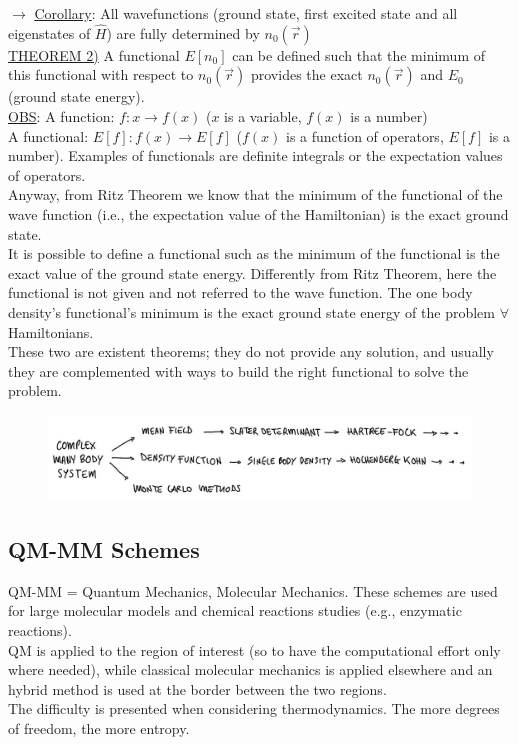 $\rightarrow\,\,$\ul{Corollary}: All wavefunctions (ground state, first excited state and all eigenstates of $\hat{H}$) are fully determined by $n_0(\vec{r})$\\

\ul{THEOREM 2)} A functional $E[n_0]$ can be defined such that the minimum of this functional with respect to $n_0(\vec{r})$ provides the exact $n_0(\vec{r})$ and $E_0$ (ground state energy).\\

\ul{OBS}: A function: $f: x \rightarrow f(x)$ ($x$ is a variable, $f(x)$ is a number)\\
A functional: $E[f]: f(x) \rightarrow E[f]$ ($f(x)$ is a function of operators, $E[f]$ is a number). 
Examples of functionals are definite integrals or the expectation values of operators.\\
Anyway, from Ritz Theorem we know that the minimum of the functional of the wave function (i.e., the expectation value of the Hamiltonian) is the exact ground state.\\

It is possible to define a functional such as the minimum of the functional is the exact value of the ground state energy. 
Differently from Ritz Theorem, here the functional is not given and not referred to the wave function. 
The one body density's functional's minimum is the exact ground state energy of the problem $\forall$ Hamiltonians.\\

These two are existent theorems; they do not provide any solution, and usually they are complemented with ways to build the right functional to solve the problem.\\
\begin{figure}[htbp!]
	\centering
	\includegraphics[scale=0.30]{img_15}
\end{figure}

\subsection{QM-MM Schemes}
QM-MM = Quantum Mechanics, Molecular Mechanics. 
These schemes are used for large molecular models and chemical reactions studies (e.g., enzymatic reactions).\\
QM is applied to the region of interest (so to have the computational effort only where needed),  while classical molecular mechanics is applied elsewhere and an hybrid method is used at the border between the two regions.\\
The difficulty is presented when considering thermodynamics. 
The more degrees of freedom, the more entropy.\\
